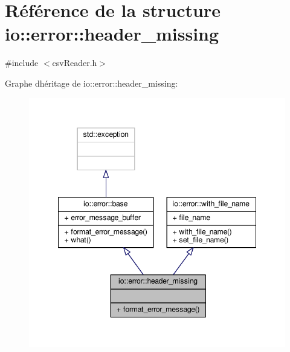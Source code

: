 \hypertarget{structio_1_1error_1_1header__missing}{}\section{Référence de la structure io\+:\+:error\+:\+:header\+\_\+missing}
\label{structio_1_1error_1_1header__missing}


{\ttfamily \#include $<$csv\+Reader.\+h$>$}



Graphe d\textquotesingle{}héritage de io\+:\+:error\+:\+:header\+\_\+missing\+:
\nopagebreak
\begin{figure}[H]
\begin{center}
\leavevmode
\includegraphics[width=348pt]{structio_1_1error_1_1header__missing__inherit__graph}
\end{center}
\end{figure}


